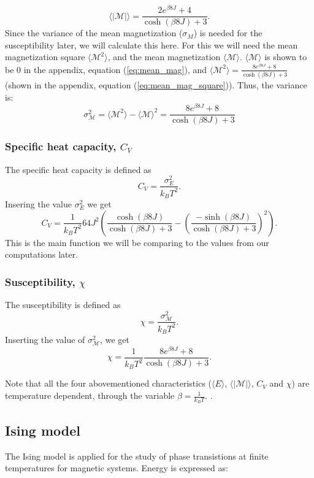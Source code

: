 \documentclass[../main.tex]{subfiles}
\begin{document}
\begin{equation*}
  \langle \mathcal{|M|} \rangle = \frac{ 2e^{\beta 8J} + 4}{\cosh(\beta 8J) + 3}.
\end{equation*}
Since the variance of the mean magnetization ($\sigma_M$) is needed for the susceptibility later, we will calculate this here. For this we will need the mean magnetization square $\langle \mathcal{M}^2 \rangle$, and the mean magnetization $\langle \mathcal{M} \rangle$. $\langle \mathcal{M} \rangle$ is shown to be $0$ in the appendix, equation (\ref{eq:mean_mag}), and  $\langle \mathcal{M}^2 \rangle = \frac{8 e^{\beta8J} +  8}{\cosh(\beta 8J) + 3}$ (shown in the appendix, equation (\ref{eq:mean_mag_square})). Thus, the variance is:
\begin{equation*}
  \sigma^2_\mathcal{M} = \langle \mathcal{M}^2 \rangle - \langle \mathcal{M} \rangle ^2 = \frac{8 e^{\beta8J} +  8}{\cosh(\beta 8J) + 3}
\end{equation*}

\subsubsection*{Specific heat capacity, $C_V$}
The specific heat capacity is defined as
\[C_V = \frac{\sigma_E^2}{k_B T^2}.\]
Insering the value $\sigma^2_E$ we get
\[C_V = \frac{1}{k_B T^2}64J^2\left(\frac{\cosh(\beta 8 J)}{\cosh(\beta 8 J) + 3} -\left(\frac{-\sinh(\beta 8 J)}{\cosh(\beta 8 J) + 3}\right)^2  \right).\]
This is the main function we will be comparing to the values from our computations later.

\subsubsection*{Susceptibility, $\chi$}
The susceptibility is defined as
\[\chi = \frac{\sigma^2_\mathcal{M}}{k_B T^2}.\]
Inserting the value of $\sigma^2_\mathcal{M}$, we get
\[\chi = \frac{1}{k_B T^2}\frac{8 e^{\beta8J} +  8}{\cosh(\beta 8J) + 3}.\]

\noindent Note that all the four abovementioned characteristics ($\langle E\rangle$, $\langle |\mathcal M|\rangle$, $C_V$ and $\chi$) are temperature dependent, through the variable $\beta = \frac{1}{k_B T}$. \cite{Mortenstatphys2019}.

\subsection{Ising model}
The Ising model is applied for the study of phase transistions at finite temperatures
for magnetic systems. Energy is expressed as:
\end{document}
